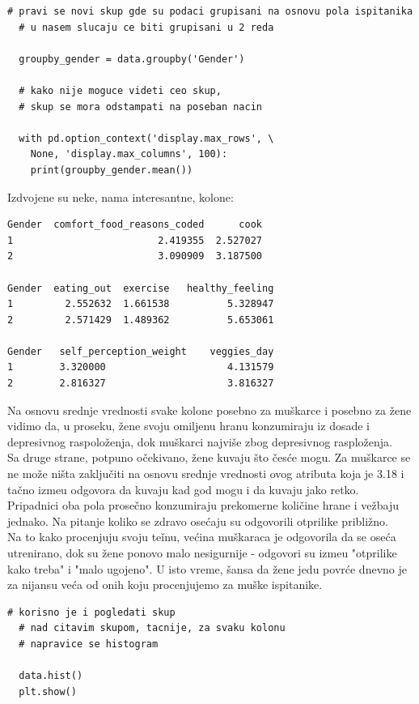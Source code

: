 \documentclass[12pt,a4paper]{article}
\begin{document}
\begin{lstlisting}[mathescape=true]
  # pravi se novi skup gde su podaci grupisani na osnovu pola ispitanika
  # u nasem slucaju ce biti grupisani u 2 reda

  groupby_gender = data.groupby('Gender')

  # kako nije moguce videti ceo skup, 
  # skup se mora odstampati na poseban nacin

  with pd.option_context('display.max_rows', \
    None, 'display.max_columns', 100):
    print(groupby_gender.mean())
\end{lstlisting}

Izdvojene su neke, nama interesantne, kolone:
\begin{verbatim}   
Gender  comfort_food_reasons_coded      cook  
1                         2.419355  2.527027   
2                         3.090909  3.187500 
        
Gender  eating_out  exercise   healthy_feeling 
1         2.552632  1.661538          5.328947
2         2.571429  1.489362          5.653061      
          
Gender   self_perception_weight    veggies_day
1        3.320000                     4.131579
2        2.816327                     3.816327
\end{verbatim}

Na osnovu srednje vrednosti svake kolone posebno za mu\v skarce i posebno za \v zene vidimo da, u proseku, \v zene svoju omiljenu hranu konzumiraju iz dosade i depresivnog raspolo\v zenja, dok mu\v skarci najvi\v se zbog depresivnog rasplo\v zenja. \\
Sa druge strane, potpuno o\v cekivano, \v zene kuvaju \v sto \v ces\' ce mogu. Za mu\v skarce se ne mo\v ze ni\v sta zaklju\v citi na osnovu srednje vrednosti ovog atributa koja je 3.18 i ta\v cno izme\dj u odgovora da kuvaju kad god mogu i da kuvaju jako retko. \\
Pripadnici oba pola prose\v cno konzumiraju prekomerne koli\v cine hrane i ve\v zbaju jednako. Na pitanje koliko se zdravo ose\' caju su odgovorili otprilike pribli\v zno. \\
Na to kako procenjuju svoju te\v inu, ve\' cina mu\v skaraca je odgovorila da se ose\' ca utrenirano, dok su \v zene ponovo malo nesigurnije - odgovori su izme\dj u "otprilike kako treba" i "malo ugojeno".
U isto vreme, \v sansa da \v zene jedu povr\' ce dnevno je za nijansu ve\' ca od onih koju procenjujemo za mu\v ske ispitanike.

\begin{lstlisting}[mathescape=true]
  # korisno je i pogledati skup
  # nad citavim skupom, tacnije, za svaku kolonu
  # napravice se histogram

  data.hist()
  plt.show()
\end{lstlisting}
\end{document}
